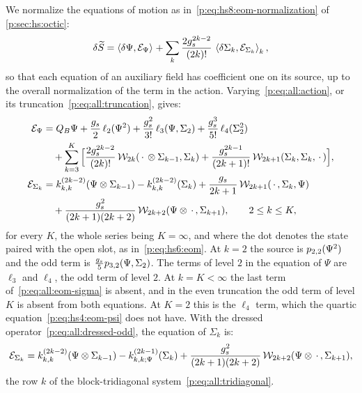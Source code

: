 We normalize the equations of motion as in~\eqref{p:eq:hs8:eom-normalization} of \cref{p:sec:hs:octic}:
\begin{equation}
\delta \caction
  = \pair{\delta \Psi}{\mathcal E_\Psi}
    + \sum_{k} \frac{2 \gs^{2 k - 2}}{(2 k)!} \, \pair[k]{\delta \Sigma_k}{\mathcal E_{\Sigma_k}},
\end{equation}
so that each equation of an auxiliary field has coefficient one on its source, up to the overall normalization of the term in the action.
Varying~\eqref{p:eq:all:action}, or its truncation~\eqref{p:eq:all:truncation}, gives:
\begin{subequations}
\label{p:eq:all:eom}
\begin{align}
  \label{p:eq:all:eom-psi}
  \mathcal E_\Psi
    &
    = Q_B \Psi
      + \frac{\gs}{2} \, \ell_2(\Psi^2)
      + \frac{\gs^2}{3!} \, \ell_3(\Psi, \Sigma_2)
      + \frac{\gs^3}{5!} \, \ell_4(\Sigma_2^2)
  \notag
  \\ &
  \quad
      + \sum_{k = 3}^{K} \Big[
        \frac{2 \gs^{2 k - 2}}{(2 k)!} \, \dvertex{2 k}(\, \cdot \, \otimes \Sigma_{k - 1}, \Sigma_k)
        + \frac{\gs^{2 k - 1}}{(2 k + 1)!} \, \dvertex{2 k + 1}(\Sigma_k, \Sigma_k, \, \cdot \,)
      \Big],
  \\
  \label{p:eq:all:eom-sigma}
  \mathcal E_{\Sigma_k}
    &
    = \kin{k}{}{2 k - 2}(\Psi \otimes \Sigma_{k - 1})
      - \kin{k}{}{2 k - 2}(\Sigma_k)
      + \frac{\gs}{2 k + 1} \, \dvertex{2 k + 1}(\, \cdot \,, \Sigma_k, \Psi)
  \notag
  \\ &
  \quad
      + \frac{\gs^2}{(2 k + 1) (2 k + 2)} \, \dvertex{2 k + 2}(\Psi \otimes \, \cdot \,, \Sigma_{k + 1}),
  \qquad
  2 \le k \le K,
\end{align}
\end{subequations}
for every $K$, the whole series being $K = \infty$, and where the dot denotes the state paired with the open slot, as in~\eqref{p:eq:hs6:eom}.
At $k = 2$ the source is $\sprod{2}{2}(\Psi^2)$ and the odd term is $\tfrac{\gs}{5} \sprod{3}{2}(\Psi, \Sigma_2)$.
The terms of level $2$ in the equation of $\Psi$ are $\ell_3$ and $\ell_4$, the odd term of level $2$.
At $k = K < \infty$ the last term of~\eqref{p:eq:all:eom-sigma} is absent, and in the even truncation the odd term of level $K$ is absent from both equations.
At $K = 2$ this is the $\ell_4$ term, which the quartic equation~\eqref{p:eq:hs4:eom-psi} does not have.
With the dressed operator~\eqref{p:eq:all:dressed-odd}, the equation of $\Sigma_k$ is:
\begin{equation}
\label{p:eq:all:eom-sigma-dressed}
\mathcal E_{\Sigma_k}
  = \kin{k}{}{2 k - 2}(\Psi \otimes \Sigma_{k - 1})
    - \kin{k}{\Psi}{2 k - 1}(\Sigma_k)
    + \frac{\gs^2}{(2 k + 1) (2 k + 2)} \, \dvertex{2 k + 2}(\Psi \otimes \, \cdot \,, \Sigma_{k + 1}),
\end{equation}
the row $k$ of the block-tridiagonal system~\eqref{p:eq:all:tridiagonal}.

